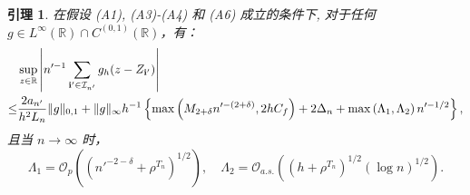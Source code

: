 \documentclass[a4paper,openay,14pt]{ctexbook}
\newtheorem{lem}{引理}
\numberwithin{equation}{section}
\numberwithin{lem}{section}
\begin{document}
\begin{lem}\label{Lemma:g_h}
    在假设 (A1), (A3)-(A4) 和 (A6) 成立的条件下, 对于任何 $g \in L^{\infty}(\mathbb{R}) \cap C^{(0,1)}(\mathbb{R})$，有：
    \begin{align}\label{EQ:g_h}
        &\sup_{z\in\mathbb{R}}\left\vert n'^{-1}\sum_{\mathbf{i}'\in\mathcal{I}_{n'}}g_h(z-Z_{\mathbf{i}'})\right\vert \notag \\
        \leq& \frac{2a_{n'}}{h^2L_{n}}\Vert g\Vert_{0,1} + \Vert g\Vert_{\infty}h^{-1}\left\{\max \left( M_{2+\delta}n'^{-(2+\delta)}, 2hC_f \right ) + 2\Delta_n + \max\left({\Lambda_1},{\Lambda_2}\right) n'^{-1/2}\right\},
    \end{align}
    且当 $n \to \infty$ 时，
    \[ \Lambda_1 = \mathcal{O}_{p}\left(\left(n'^{-2-\delta}+\rho^{T_n}\right)^{1/2}\right), \quad \Lambda_2 = \mathcal{O}_{a.s.}\left(\left(h+\rho^{T_n}\right)^{1/2}\left(\log n\right)^{1/2}\right). \]
\end{lem}
\end{document}
